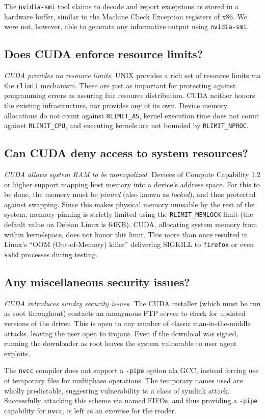 \documentclass[letterpaper,10pt]{article}
\begin{document}
\begin{multicols}{2}
The \texttt{nvidia-smi} tool claims to decode and report exceptions as stored
in a hardware buffer, similar to the Machine Check Exception registers of x86.
We were not, however, able to generate any informative output using \texttt{nvidia-smi}.
\subsection{Does CUDA enforce resource limits?}
\textit{CUDA provides no resource limits.} UNIX provides a rich set of resource
limits via the \texttt{rlimit} mechanism. These are just as important for
protecting against programming errors as assuring fair resource distribution.
CUDA neither honors the existing infrastructure, nor provides any of its own.
Device memory allocations do not count against \texttt{RLIMIT\_AS}, kernel
execution time does not count against \texttt{RLIMIT\_CPU}, and executing
kernels are not bounded by \texttt{RLIMIT\_NPROC}.
\subsection{Can CUDA deny access to system resources?}
\textit{CUDA allows system RAM to be monopolized.} Devices of Compute Capability
1.2 or higher support mapping host memory into a device's address space. For this
to be done, the memory must be \textit{pinned} (also known as \textit{locked}), and
thus protected against swapping. Since this makes physical memory unusable by the
rest of the system, memory pinning is strictly limited using the \texttt{RLIMIT\_MEMLOCK}
limit (the default value on Debian Linux is 64KB). CUDA, allocating system memory
from within kernelspace, does not honor this limit. This more than once resulted in
Linux's ``OOM (Out-of-Memory) killer'' delivering SIGKILL to \texttt{firefox} or even \texttt{sshd}
processes during testing.
\subsection{Any miscellaneous security issues?}
\textit{CUDA introduces sundry security issues.} The CUDA installer (which
must be run as root throughout) contacts an anonymous FTP server to check for
updated versions of the driver. This is open to any number of classic man-in-the-middle
attacks, leaving the user open to trojans. Even if the download was signed,
running the downloader as root leaves the system vulnerable to user agent
exploits.

The \texttt{nvcc} compiler does not support a \texttt{-pipe} option ala GCC,
instead forcing use of temporary files for multiphase operations. The temporary
names used are wholly predictable, suggesting vulnerability to a class of
symlink attack. Successfully attacking this scheme via named FIFOs, and thus
providing a \texttt{-pipe} capability for \texttt{nvcc}, is left as an exercise
for the reader.


\end{multicols}
\end{document}
